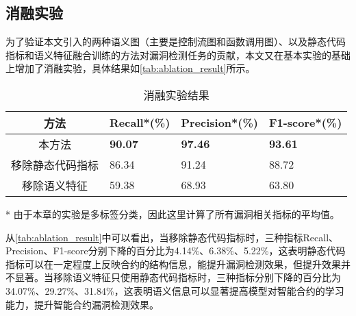 \subsection{消融实验}
\label{sec:消融实验}
为了验证本文引入的两种语义图（主要是控制流图和函数调用图）、以及静态代码指标和语义特征融合训练的方法对漏洞检测任务的贡献，本文又在基本实验的基础上增加了消融实验，具体结果如\autoref{tab:ablation_result}所示。
\begin{table}[htbp]
    \caption{\label{tab:ablation_result}消融实验结果}
    \small
    \begin{threeparttable}{
    \renewcommand{\arraystretch}{1.5}
    \begin{tabularx}{\linewidth}{cX<{\centering}X<{\centering}X<{\centering}}
        \hline
        方法 & Recall*(\%) & Precision*(\%) & F1-score*(\%) \\
        \hline
        本方法 & \textbf{90.07} & \textbf{97.46} & \textbf{93.61} \\
        移除静态代码指标 & 86.34 & 91.24 & 88.72 \\
        移除语义特征 & 59.38 & 68.93 & 63.80 \\
        \hline
    \end{tabularx}
    }
    \begin{tablenotes}
        \footnotesize
        \item[*] 由于本章的实验是多标签分类，因此这里计算了所有漏洞相关指标的平均值。
    \end{tablenotes}
\end{threeparttable}
\end{table}

从\autoref{tab:ablation_result}中可以看出，当移除静态代码指标时，三种指标Recall、Precision、F1-score分别下降的百分比为4.14\%、6.38\%、5.22\%，这表明静态代码指标可以在一定程度上反映合约的结构信息，能提升漏洞检测效果，但提升效果并不显著。当移除语义特征只使用静态代码指标时，三种指标分别下降的百分比为34.07\%、29.27\%、31.84\%，这表明语义信息可以显著提高模型对智能合约的学习能力，提升智能合约漏洞检测效果。




